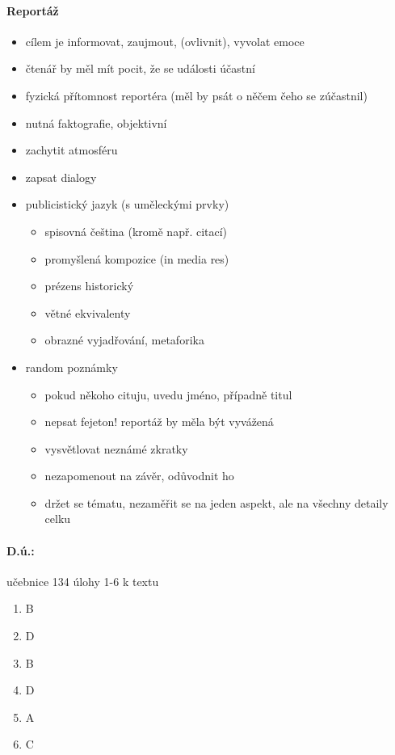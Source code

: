 \paragraph{Reportáž}
\begin{itemize}
\item cílem je informovat, zaujmout, (ovlivnit), vyvolat emoce
\item čtenář by měl mít pocit, že se události účastní
\item fyzická přítomnost reportéra (měl by psát o něčem čeho se zúčastnil)
\item nutná faktografie, objektivní
\item zachytit atmosféru
\item zapsat dialogy
\item publicistický jazyk (s uměleckými prvky)
	\begin{itemize}
	\item spisovná čeština (kromě např. citací)
	\item promyšlená kompozice (in media res)
	\item prézens historický
	\item větné ekvivalenty
	\item obrazné vyjadřování, metaforika
	\end{itemize}
\item random poznámky
	\begin{itemize}
	\item pokud někoho cituju, uvedu jméno, případně titul
	\item nepsat fejeton! reportáž by měla být vyvážená
	\item vysvětlovat neznámé zkratky
	\item nezapomenout na závěr, odůvodnit ho
	\item držet se tématu, nezaměřit se na jeden aspekt, ale na všechny detaily celku
	\end{itemize}
\end{itemize}

\paragraph{D.ú.:} učebnice 134 úlohy 1-6 k textu
\begin{enumerate}
\item B
\item D
\item B
\item D
\item A
\item C
\end{enumerate}


